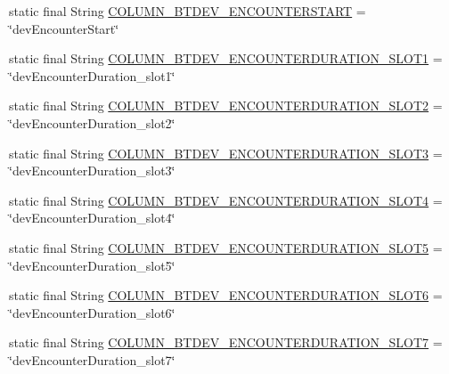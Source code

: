 \begin{DoxyCompactItemize}
\item 
static final String \hyperlink{classcs_1_1nsense_1_1db_1_1_n_sense_s_q_lite_helper_a9356c28b162b3997d82d6c078634ec10}{C\-O\-L\-U\-M\-N\-\_\-\-B\-T\-D\-E\-V\-\_\-\-E\-N\-C\-O\-U\-N\-T\-E\-R\-S\-T\-A\-R\-T} = \char`\"{}dev\-Encounter\-Start\char`\"{}
\item 
static final String \hyperlink{classcs_1_1nsense_1_1db_1_1_n_sense_s_q_lite_helper_a76beab73c4c6dca4fc15c556da95a7c2}{C\-O\-L\-U\-M\-N\-\_\-\-B\-T\-D\-E\-V\-\_\-\-E\-N\-C\-O\-U\-N\-T\-E\-R\-D\-U\-R\-A\-T\-I\-O\-N\-\_\-\-S\-L\-O\-T1} = \char`\"{}dev\-Encounter\-Duration\-\_\-slot1\char`\"{}
\item 
static final String \hyperlink{classcs_1_1nsense_1_1db_1_1_n_sense_s_q_lite_helper_a04ffdeacd409f6b6b262eef50f604ad0}{C\-O\-L\-U\-M\-N\-\_\-\-B\-T\-D\-E\-V\-\_\-\-E\-N\-C\-O\-U\-N\-T\-E\-R\-D\-U\-R\-A\-T\-I\-O\-N\-\_\-\-S\-L\-O\-T2} = \char`\"{}dev\-Encounter\-Duration\-\_\-slot2\char`\"{}
\item 
static final String \hyperlink{classcs_1_1nsense_1_1db_1_1_n_sense_s_q_lite_helper_ac14029ad8e6146869a054ab91a60feb3}{C\-O\-L\-U\-M\-N\-\_\-\-B\-T\-D\-E\-V\-\_\-\-E\-N\-C\-O\-U\-N\-T\-E\-R\-D\-U\-R\-A\-T\-I\-O\-N\-\_\-\-S\-L\-O\-T3} = \char`\"{}dev\-Encounter\-Duration\-\_\-slot3\char`\"{}
\item 
static final String \hyperlink{classcs_1_1nsense_1_1db_1_1_n_sense_s_q_lite_helper_ac7af5b84e77b2347356b23528559710b}{C\-O\-L\-U\-M\-N\-\_\-\-B\-T\-D\-E\-V\-\_\-\-E\-N\-C\-O\-U\-N\-T\-E\-R\-D\-U\-R\-A\-T\-I\-O\-N\-\_\-\-S\-L\-O\-T4} = \char`\"{}dev\-Encounter\-Duration\-\_\-slot4\char`\"{}
\item 
static final String \hyperlink{classcs_1_1nsense_1_1db_1_1_n_sense_s_q_lite_helper_afb2a5bc1f52052963cba23e23925ceca}{C\-O\-L\-U\-M\-N\-\_\-\-B\-T\-D\-E\-V\-\_\-\-E\-N\-C\-O\-U\-N\-T\-E\-R\-D\-U\-R\-A\-T\-I\-O\-N\-\_\-\-S\-L\-O\-T5} = \char`\"{}dev\-Encounter\-Duration\-\_\-slot5\char`\"{}
\item 
static final String \hyperlink{classcs_1_1nsense_1_1db_1_1_n_sense_s_q_lite_helper_a5498bb02155437579e204a588d142230}{C\-O\-L\-U\-M\-N\-\_\-\-B\-T\-D\-E\-V\-\_\-\-E\-N\-C\-O\-U\-N\-T\-E\-R\-D\-U\-R\-A\-T\-I\-O\-N\-\_\-\-S\-L\-O\-T6} = \char`\"{}dev\-Encounter\-Duration\-\_\-slot6\char`\"{}
\item 
static final String \hyperlink{classcs_1_1nsense_1_1db_1_1_n_sense_s_q_lite_helper_acdaa8699a82f7ea888a163130e00b0f6}{C\-O\-L\-U\-M\-N\-\_\-\-B\-T\-D\-E\-V\-\_\-\-E\-N\-C\-O\-U\-N\-T\-E\-R\-D\-U\-R\-A\-T\-I\-O\-N\-\_\-\-S\-L\-O\-T7} = \char`\"{}dev\-Encounter\-Duration\-\_\-slot7\char`\"{}

\end{DoxyCompactItemize}
